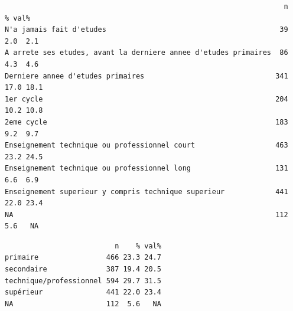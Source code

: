 \documentclass[
  letterpaper,
  DIV=11,
  numbers=noendperiod,
  oneside]{scrreprt}
\newenvironment{Shaded}{\begin{snugshade}}{\end{snugshade}}
\newcommand{\FunctionTok}[1]{\textcolor[rgb]{0.28,0.35,0.67}{#1}}
\newcommand{\NormalTok}[1]{\textcolor[rgb]{0.00,0.23,0.31}{#1}}
\newcommand{\OtherTok}[1]{\textcolor[rgb]{0.00,0.23,0.31}{#1}}
\newcommand{\SpecialCharTok}[1]{\textcolor[rgb]{0.37,0.37,0.37}{#1}}
\newcommand{\StringTok}[1]{\textcolor[rgb]{0.13,0.47,0.30}{#1}}
\begin{document}
\begin{verbatim}
                                                                  n    % val%
N'a jamais fait d'etudes                                         39  2.0  2.1
A arrete ses etudes, avant la derniere annee d'etudes primaires  86  4.3  4.6
Derniere annee d'etudes primaires                               341 17.0 18.1
1er cycle                                                       204 10.2 10.8
2eme cycle                                                      183  9.2  9.7
Enseignement technique ou professionnel court                   463 23.2 24.5
Enseignement technique ou professionnel long                    131  6.6  6.9
Enseignement superieur y compris technique superieur            441 22.0 23.4
NA                                                              112  5.6   NA
\end{verbatim}

\begin{Shaded}
\end{Shaded}

\begin{verbatim}
                          n    % val%
primaire                466 23.3 24.7
secondaire              387 19.4 20.5
technique/professionnel 594 29.7 31.5
supérieur               441 22.0 23.4
NA                      112  5.6   NA
\end{verbatim}
\end{document}
